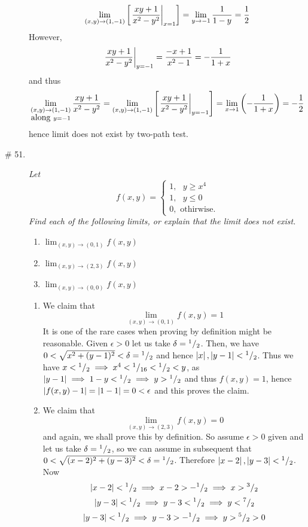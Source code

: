 \documentclass[8pt]{article} %
\begin{document}
\begin{description}
{\[			\lim_{(x,y)\to(1,-1)}\mysbra{\left.\f\right|_{x=1}}=\lim_{y\to-1}\frac{1}{1-y}=\frac{1}{2}\]
			However, \[\left.\frac{xy+1}{x^2-y^2}\right|_{y=-1}=\frac{-x+1}{x^2-1}=-\frac{1}{1+x}\]
		and thus
		\[\lim_{\begin{subarray}{c}(x,y)\to(1,-1)\\\mbox{along }y=-1\end{subarray}}\f=
			\lim_{(x,y)\to(1,-1)}\mysbra{\left.\f\right|_{y=-1}}=\lim_{x\to1}\mybra{-\frac{1}{1+x}}=-\frac{1}{2}\]
		hence limit does not exist by two-path test.
		}
	\item[\# 51.]{{\it Let}
		\[f(x,y)=\begin{cases}1,\mbox{ }y\geq x^4\\1,\mbox{ }y\leq 0\\0,\mbox{ othirwise.}\end{cases}\]
		{\it Find each of the following limits, or explain that the limit does not exist.}
		\begin{enumerate}[\bfseries a.]
			\item $\lim_{(x,y)\to(0,1)}f(x,y)$
			\item $\lim_{(x,y)\to(2,3)}f(x,y)$
			\item $\lim_{(x,y)\to(0,0)}f(x,y)$
		\end{enumerate}
		\begin{enumerate}[\bfseries a.]
			\item We claim that \[\lim_{(x,y)\to(0,1)}f(x,y)=1\]
				It is one of the rare cases when proving by definition might be reasonable. Given $\epsilon>0$ let
				us take $\delta={^{1}/_{2}}$. Then, we have $0<\sqrt{x^2+(y-1)^2}<\delta={^{1}/_{2}}$ and
				hence $\left|x\right|,\left|y-1\right|<{^{1}/_{2}}$. Thus we have $x<{^{1}/_{2}}\implies
				x^4<{^{1}/_{16}}<{^{1}/_{2}}<y$, as $\left|y-1\right|\implies 1-y<{^{1}/_{2}}\implies y>{^{1}/_{2}}$ and thus $f(x,y)=1$, hence $\left|f(x,y)-1\right|=\left|1-1\right|=0<\epsilon$ and this proves the claim.
			\item We claim that \[\lim_{(x,y)\to(2,3)}f(x,y)=0\]
				and again, we shall prove this by definition. So assume $\epsilon>0$ given and let us take
				$\delta={^{1}/_{2}}$, so we can assume in subsequent that 
				$0<\sqrt{(x-2)^2+(y-3)^2}<\delta={^{1}/_{2}}$. Therefore $\left|x-2\right|,\left|y-3\right|<{^{1}/_{2}}$. Now
				\[\left|x-2\right|<{^{1}/_{2}}\implies x-2>-{^{1}/_{2}}\implies x>{^{3}/_{2}}\]
				\[\left|y-3\right|<{^{1}/_{2}}\implies y-3<{^{1}/_{2}}\implies y<{^{7}/_{2}}\]
				\[\left|y-3\right|<{^{1}/_{2}}\implies y-3>-{^{1}/_{2}}\implies y>{^{5}/_{2}}>0\]

\end{enumerate}}
\end{description}
\end{document}
